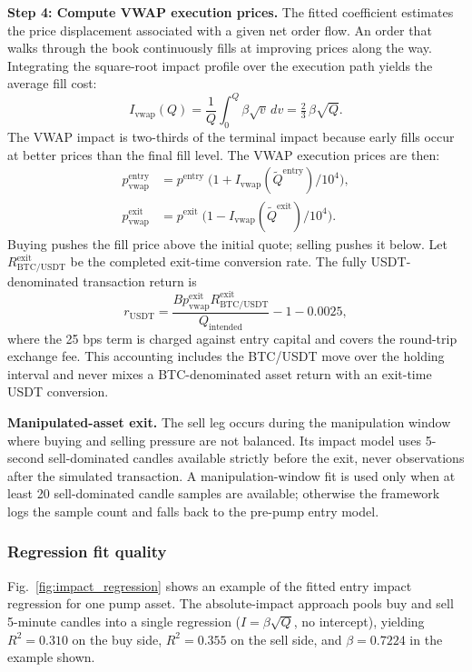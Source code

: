 \documentclass{ieeeaccess}
\begin{document}
\textbf{Step 4: Compute VWAP execution prices.} The fitted coefficient estimates the price displacement associated with a given net order flow. An order that walks through the book continuously fills at improving prices along the way. Integrating the square-root impact profile over the execution path yields the average fill cost:
\begin{equation}
    I_{\mathrm{vwap}}(Q)
      = \frac{1}{Q}\int_{0}^{Q}\!\beta\sqrt{v}\,dv
      = \tfrac{2}{3}\,\beta\sqrt{Q}.
    \label{eq:vwap_correction}
\end{equation}
The VWAP impact is two-thirds of the terminal impact because early fills occur at better prices than the final fill level. The VWAP execution prices are then:
\begin{align}
    p^{\mathrm{entry}}_{\mathrm{vwap}} &= p^{\mathrm{entry}}\;\bigl(1 + I_{\mathrm{vwap}}(\widetilde Q^{\mathrm{entry}}) / 10^4\bigr), \label{eq:vwap_entry}\\
    p^{\mathrm{exit}}_{\mathrm{vwap}}  &= p^{\mathrm{exit}}\;\bigl(1 - I_{\mathrm{vwap}}(\widetilde Q^{\mathrm{exit}}) / 10^4\bigr). \label{eq:vwap_exit}
\end{align}
Buying pushes the fill price above the initial quote; selling pushes it below. Let $R^{\mathrm{exit}}_{\mathrm{BTC/USDT}}$ be the completed exit-time conversion rate. The fully USDT-denominated transaction return is
\begin{equation}
    r_{\mathrm{USDT}}
      = \frac{B p^{\mathrm{exit}}_{\mathrm{vwap}} R^{\mathrm{exit}}_{\mathrm{BTC/USDT}}}
             {Q_{\mathrm{intended}}}
        - 1 - 0.0025,
    \label{eq:tx_return}
\end{equation}
where the 25 bps term is charged against entry capital and covers the round-trip exchange fee. This accounting includes the BTC/USDT move over the holding interval and never mixes a BTC-denominated asset return with an exit-time USDT conversion.

\textbf{Manipulated-asset exit.} The sell leg occurs during the manipulation window where buying and selling pressure are not balanced. Its impact model uses 5-second sell-dominated candles available strictly before the exit, never observations after the simulated transaction. A manipulation-window fit is used only when at least 20 sell-dominated candle samples are available; otherwise the framework logs the sample count and falls back to the pre-pump entry model.

\subsubsection{Regression fit quality}
Fig.~\ref{fig:impact_regression} shows an example of the fitted entry impact regression for one pump asset. The absolute-impact approach pools buy and sell 5-minute candles into a single regression ($I = \beta\sqrt{Q}$, no intercept), yielding $R^2 = 0.310$ on the buy side, $R^2 = 0.355$ on the sell side, and $\beta = 0.7224$ in the example shown.
\end{document}
